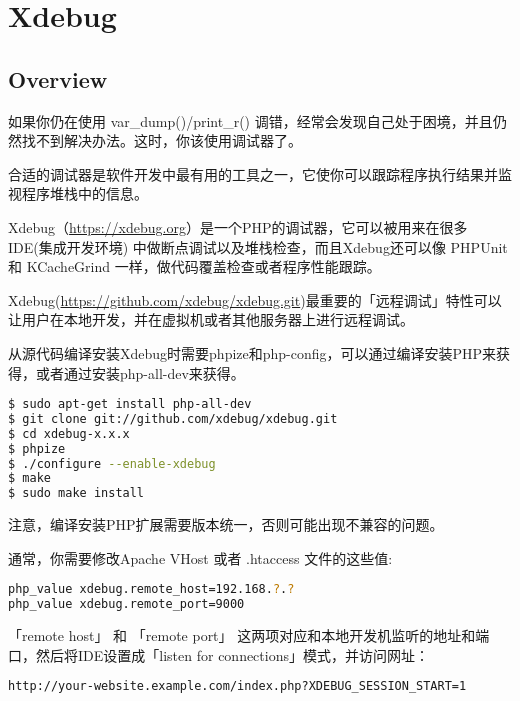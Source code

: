 \part{Xdebug}


\chapter{Overview}

如果你仍在使用 var\_dump()/print\_r() 调错，经常会发现自己处于困境，并且仍然找不到解决办法。这时，你该使用调试器了。

合适的调试器是软件开发中最有用的工具之一，它使你可以跟踪程序执行结果并监视程序堆栈中的信息。 

Xdebug（\url{https://xdebug.org}）是一个PHP的调试器，它可以被用来在很多 IDE(集成开发环境) 中做断点调试以及堆栈检查，而且Xdebug还可以像 PHPUnit 和 KCacheGrind 一样，做代码覆盖检查或者程序性能跟踪。



Xdebug(\url{https://github.com/xdebug/xdebug.git})最重要的「远程调试」特性可以让用户在本地开发，并在虚拟机或者其他服务器上进行远程调试。

从源代码编译安装Xdebug时需要phpize和php-config，可以通过编译安装PHP来获得，或者通过安装php-all-dev来获得。


\begin{lstlisting}[language=bash]
$ sudo apt-get install php-all-dev
$ git clone git://github.com/xdebug/xdebug.git
$ cd xdebug-x.x.x
$ phpize
$ ./configure --enable-xdebug
$ make
$ sudo make install
\end{lstlisting}

注意，编译安装PHP扩展需要版本统一，否则可能出现不兼容的问题。

通常，你需要修改Apache VHost 或者 .htaccess 文件的这些值:

\begin{lstlisting}[language=bash]
php_value xdebug.remote_host=192.168.?.?
php_value xdebug.remote_port=9000
\end{lstlisting}



「remote host」 和 「remote port」 这两项对应和本地开发机监听的地址和端口，然后将IDE设置成「listen for connections」模式，并访问网址：


\begin{lstlisting}[language=bash]
http://your-website.example.com/index.php?XDEBUG_SESSION_START=1
\end{lstlisting}



